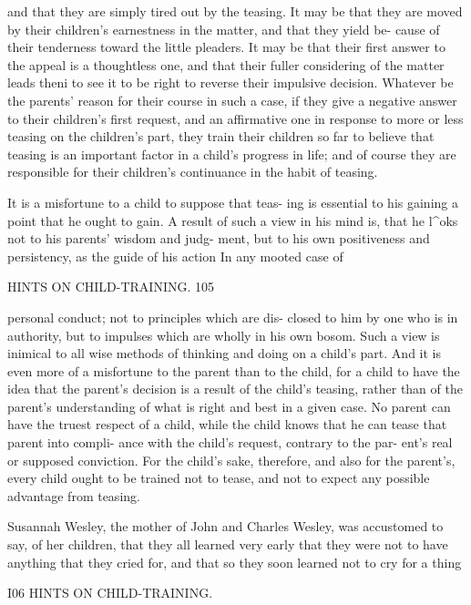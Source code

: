 \documentclass[
]{book}
\begin{document}
and that they are simply tired out by the teasing. It may be that they are moved by their children's earnestness in the matter, and that they yield be- cause of their tenderness toward the little pleaders. It may be that their first answer to the appeal is a thoughtless one, and that their fuller considering of the matter leads theni to see it to be right to reverse their impulsive decision. Whatever be the parents' reason for their course in such a case, if they give a negative answer to their children's first request, and an affirmative one in response to more or less teasing on the children's part, they train their children so far to believe that teasing is an important factor in a child's progress in life; and of course they are responsible for their children's continuance in the habit of teasing.

It is a misfortune to a child to suppose that teas- ing is essential to his gaining a point that he ought to gain. A result of such a view in his mind is, that he l\^{}oks not to his parents' wisdom and judg- ment, but to his own positiveness and persistency, as the guide of his action In any mooted case of

HINTS ON CHILD-TRAINING. 105

personal conduct; not to principles which are dis- closed to him by one who is in authority, but to impulses which are wholly in his own bosom. Such a view is inimical to all wise methods of thinking and doing on a child's part. And it is even more of a misfortune to the parent than to the child, for a child to have the idea that the parent's decision is a result of the child's teasing, rather than of the parent's understanding of what is right and best in a given case. No parent can have the truest respect of a child, while the child knows that he can tease that parent into compli- ance with the child's request, contrary to the par- ent's real or supposed conviction. For the child's sake, therefore, and also for the parent's, every child ought to be trained not to tease, and not to expect any possible advantage from teasing.

Susannah Wesley, the mother of John and Charles Wesley, was accustomed to say, of her children, that they all learned very early that they were not to have anything that they cried for, and that so they soon learned not to cry for a thing

I06 HINTS ON CHILD-TRAINING.
\end{document}
